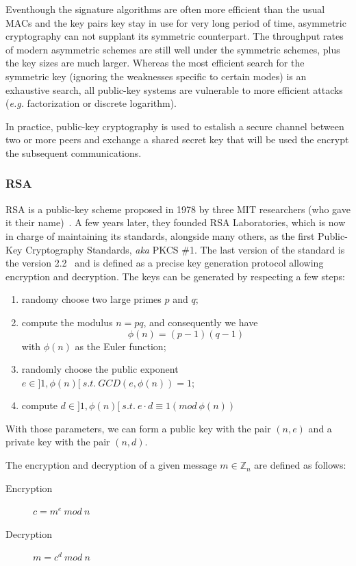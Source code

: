 Eventhough the signature algorithms are often more efficient than the usual MACs and the key pairs key stay in use for very long period of time, asymmetric cryptography can not supplant its symmetric counterpart.
The throughput rates of modern asymmetric schemes are still well under the symmetric schemes, plus the key sizes are much larger.
Whereas the most efficient search for the symmetric key (ignoring the weaknesses specific to certain modes) is an exhaustive search, all public-key systems are vulnerable to more efficient attacks (\textit{e.g.} factorization or discrete logarithm).

In practice, public-key cryptography is used to estalish a secure channel between two or more peers and exchange a shared secret key that will be used the encrypt the subsequent communications.

\subsubsection{RSA}
RSA is a public-key scheme proposed in 1978 by three MIT researchers (who gave it their name)~\cite{Rivest:1978:MOD:359340.359342}.
A few years later, they founded RSA Laboratories, which is now in charge of maintaining its standards, alongside many others, as the first Public-Key Cryptography Standards, \textit{aka} PKCS \#1.
The last version of the standard is the version 2.2~\cite{pkcs1} and is defined as a precise key generation protocol allowing encryption and decryption.
The keys can be generated by respecting a few steps:
\begin{enumerate}
	\item randomy choose two large primes $p$ and $q$;
	\item compute the modulus $n = p q$, and consequently we have \[\phi(n) = (p-1)(q-1)\]with $\phi(n)$ as the Euler function;
	\item randomly choose the public exponent $e \in ]1,\phi(n)[\ s.t.\ GCD(e,\phi(n)) = 1$;
	\item compute $d \in ]1,\phi(n)[\ s.t.\ e \cdot d \equiv 1 (mod\ \phi(n))$
\end{enumerate}

With those parameters, we can form a public key with the pair $(n, e)$ and a private key with the pair $(n, d)$.

The encryption and decryption of a given message $m \in \mathds{Z}_n$ are defined as follows:
\begin{description}
	\item[Encryption] $c = m^e\ mod\ n$
	\item[Decryption] $m = c^d\ mod\ n$
\end{description}

